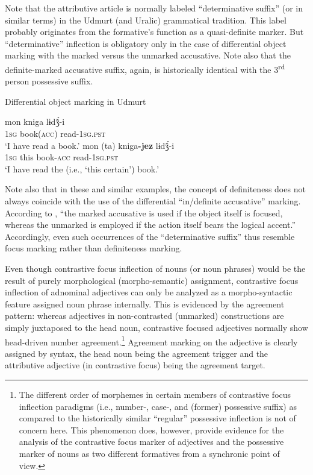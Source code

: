 Note that the attributive article is normally labeled “determinative suffix” (or in similar terms) in the Udmurt (and Uralic) grammatical tradition. This label probably originates from the formative's function as a quasi-definite marker. But “determinative” inflection is obligatory only in the case of differential object marking with the marked versus the unmarked accusative. Note also that the definite-marked accusative suffix, again, is historically identical with the 3\textsuperscript{rd} person possessive suffix.
\begin{exe}
\ex \rm{Differential object marking in Udmurt \citep[22]{winkler2001}}
\begin{xlist}
\ex
\gll	mon kniga lɨdǯ́-i\\
	\textsc{1sg} book(\textsc{acc}) read-\textsc{1sg.pst}\\
\glt	‘I have read a book.’
\ex	
\gll	mon (ta) kniga\textbf{-jez} lɨdǯ́-i\\
	\textsc{1sg} this book-\textsc{acc} read-\textsc{1sg.pst}\\
\glt	‘I have read the (i.e., ‘this certain’) book.’
\end{xlist}
\end{exe}
Note also that in these and similar examples, the concept of definiteness does not always coincide with the use of the differential “in\slash{}definite accusative” marking. According to \citet[21]{winkler2001}, “the marked accusative is used if the object itself is focused, whereas the unmarked is employed if the action itself bears the logical accent.” Accordingly, even such occurrences of the “determinative suffix” thus resemble focus marking rather than definiteness marking.

Even though contrastive focus inflection of nouns (or noun phrases) would be the result of purely morphological (morpho-semantic) assignment, contrastive focus inflection of adnominal adjectives can only be analyzed as a morpho-syntactic feature assigned noun phrase internally. This is evidenced by the agreement pattern: whereas adjectives in non-contrasted (unmarked) constructions are simply juxtaposed to the head noun, contrastive focused adjectives normally show head\hyp{}driven number agreement.\footnote{The different order of morphemes in certain members of contrastive focus inflection paradigms (i.e., number-, case-, and (former) possessive suffix) as compared to the historically similar “regular” possessive inflection \citep[32]{winkler2001} is not of concern here. This phenomenon does, however, provide evidence for the analysis of the contrastive focus marker of adjectives and the possessive marker of nouns as two different formatives from a synchronic point of view.} Agreement marking on the adjective is clearly assigned by syntax, the head noun being the agreement trigger and the attributive adjective (in contrastive focus) being the agreement target.

